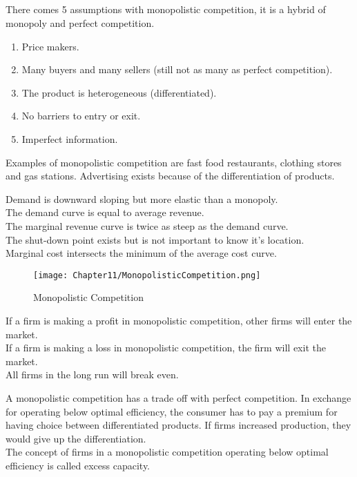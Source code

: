 \subsection{}
There comes 5 assumptions with monopolistic competition,
it is a hybrid of monopoly and perfect competition.
\begin{enumerate}
    \item Price makers.
    \item Many buyers and many sellers (still not as many as perfect competition).
    \item The product is heterogeneous (differentiated).
    \item No barriers to entry or exit.
    \item Imperfect information.
\end{enumerate}
Examples of monopolistic competition are fast food restaurants, clothing stores and gas stations.
Advertising exists because of the differentiation of products.
\par
Demand is downward sloping but more elastic than a monopoly.\\
The demand curve is equal to average revenue.\\
The marginal revenue curve is twice as steep as the demand curve.\\
The shut-down point exists but is not important to know it's location.\\
Marginal cost intersects the minimum of the average cost curve.
\begin{figure}[H]
    \centering
    \texttt{[image: Chapter11/MonopolisticCompetition.png]}
    \caption{Monopolistic Competition}
    \label{fig:monopolisticcompetition}
\end{figure}
If a firm is making a profit in monopolistic competition, other firms will enter the market.\\
If a firm is making a loss in monopolistic competition, the firm will exit the market.\\
All firms in the long run will break even.
\par
A monopolistic competition has a trade off with perfect competition.
In exchange for operating below optimal efficiency, the consumer has to pay a premium for having choice between
differentiated products. If firms increased production, they would give up the differentiation.\\
The concept of firms in a monopolistic competition operating below optimal efficiency is called excess capacity.